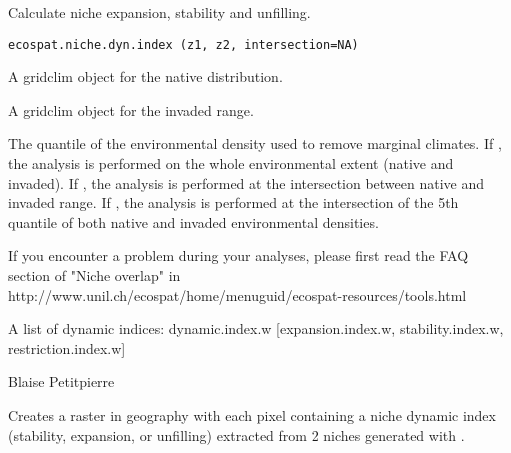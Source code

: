 \documentclass[a4paper]{book}
\begin{document}
%
\begin{Description}\relax
Calculate niche expansion, stability and unfilling.
\end{Description}
%
\begin{Usage}
\begin{verbatim}
ecospat.niche.dyn.index (z1, z2, intersection=NA)
\end{verbatim}
\end{Usage}
%
\begin{Arguments}
\begin{ldescription}
\item[\code{z1}] A gridclim object for the native distribution.
\item[\code{z2}] A gridclim object for the invaded range.
\item[\code{intersection}] The quantile of the environmental density used to remove marginal climates. If , the analysis is performed on the whole environmental extent (native and invaded). If , the analysis is performed at the intersection between native and invaded range. If , the analysis is performed at the intersection of the 5th quantile of both native and invaded environmental densities.
\end{ldescription}
\end{Arguments}
%
\begin{Details}\relax
If you encounter a problem during your analyses, please first read the FAQ section of "Niche overlap" in http://www.unil.ch/ecospat/home/menuguid/ecospat-resources/tools.html
\end{Details}
%
\begin{Value}
A list of dynamic indices: dynamic.index.w [expansion.index.w, stability.index.w, restriction.index.w]
\end{Value}
%
\begin{Author}\relax
Blaise Petitpierre 
\end{Author}
%
\begin{SeeAlso}\relax
{}
\end{SeeAlso}
%
\begin{Description}\relax
Creates a raster in geography with each pixel containing a niche dynamic index (stability, expansion, or unfilling) extracted from 2 niches generated with .
\end{Description}
\end{document}
